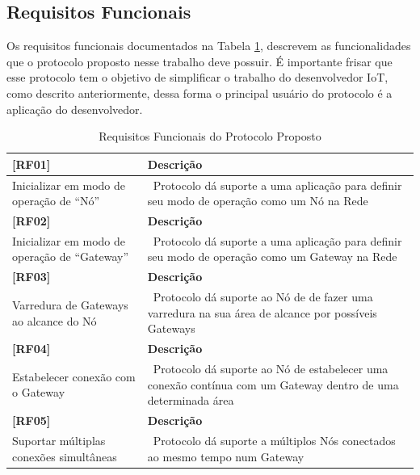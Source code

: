 \subsection{Requisitos Funcionais}

Os requisitos funcionais documentados na Tabela \ref{tab:rfs}, descrevem
as funcionalidades que o protocolo proposto nesse trabalho deve possuir. É importante
frisar que esse protocolo tem o objetivo de simplificar o trabalho do desenvolvedor IoT,
como descrito anteriormente, dessa forma o principal usuário do protocolo é a aplicação
do desenvolvedor.


\begin{longtable}{|p{3.5cm}|p{9.0cm}|}
    \caption{Requisitos Funcionais do Protocolo Proposto}\label{tab:rfs} \\
    
    \hline
    \textbf{[RF01]} & \textbf{Descrição} \\
    \hline
    Inicializar em modo de operação de \newline “Nó” & \
    Protocolo dá suporte a uma aplicação para definir seu modo de operação como um Nó na Rede \\
    
    \hline
    \textbf{[RF02]} & \textbf{Descrição} \\
    \hline
    Inicializar em modo de operação de \newline “Gateway” & \
    Protocolo dá suporte a uma aplicação para definir seu modo de operação como um Gateway na Rede \\
    
    \hline
    \textbf{[RF03]} & \textbf{Descrição} \\
    \hline
    Varredura de \newline Gateways ao alcance do Nó & \
    Protocolo dá suporte ao Nó de de fazer uma varredura na sua área de alcance por possíveis Gateways \\
    
    \hline
    \textbf{[RF04]} & \textbf{Descrição} \\
    \hline
    Estabelecer \newline conexão com o \newline Gateway & \
    Protocolo dá suporte ao Nó de estabelecer uma conexão contínua com um Gateway dentro de uma determinada área \\
    \hline
    \newpage
    \hline
    \textbf{[RF05]} & \textbf{Descrição} \\
    \hline
    Suportar \newline múltiplas conexões \newline simultâneas & \
    Protocolo dá suporte a múltiplos Nós conectados ao mesmo tempo num Gateway \\
    

\end{longtable}
